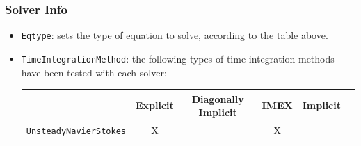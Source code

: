 \subsubsection{Solver Info}

\begin{itemize}
\item \texttt{Eqtype}:  sets the type of equation to solve, according to the table above.
\item \texttt{TimeIntegrationMethod}: the following types of time integration methods have been tested with each solver:
\begin{table}
\begin{center}
\begin{tabular}{|l|c|c|c|c|c|} \hline
{} & {Explicit} &{Diagonally Implicit} &{IMEX} & {Implicit} \\ \hline
\texttt{UnsteadyNavierStokes} & X & &X & \\ \hline
\end{tabular}
\end{center}
\end{table}
\end{itemize}


